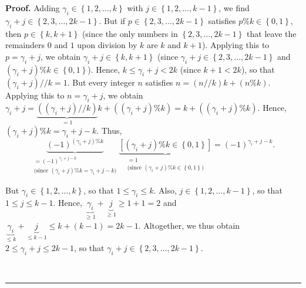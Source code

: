 \documentclass[numbers=enddot,12pt,final,onecolumn,notitlepage]{scrartcl}%
\theoremstyle{definition}
\newenvironment{proof}[1][Proof]{\noindent\textbf{#1.} }{\ \rule{0.5em}{0.5em}}
\newenvironment{verlong}{}{}
\newenvironment{vershort}{}{}
\begin{document}
\begin{proof}
\begin{vershort}
Adding $\gamma_{i}\in\left\{  1,2,\ldots,k\right\}  $ with $j\in\left\{
1,2,\ldots,k-1\right\}  $, we find $\gamma_{i}+j\in\left\{  2,3,\ldots
,2k-1\right\}  $. But if $p\in\left\{  2,3,\ldots,2k-1\right\}  $ satisfies
$p\%k\in\left\{  0,1\right\}  $, then $p\in\left\{  k,k+1\right\}  $ (since
the only numbers in $\left\{  2,3,\ldots,2k-1\right\}  $ that leave the
remainders $0$ and $1$ upon division by $k$ are $k$ and $k+1$). Applying this
to $p=\gamma_{i}+j$, we obtain $\gamma_{i}+j\in\left\{  k,k+1\right\}  $
(since $\gamma_{i}+j\in\left\{  2,3,\ldots,2k-1\right\}  $ and $\left(
\gamma_{i}+j\right)  \%k\in\left\{  0,1\right\}  $). Hence, $k\leq\gamma
_{i}+j<2k$ (since $k+1<2k$), so that $\left(  \gamma_{i}+j\right)  //k=1$. But
every integer $n$ satisfies $n=\left(  n//k\right)  k+\left(  n\%k\right)  $.
Applying this to $n=\gamma_{i}+j$, we obtain $\gamma_{i}+j=\underbrace{\left(
\left(  \gamma_{i}+j\right)  //k\right)  }_{=1}k+\left(  \left(  \gamma
_{i}+j\right)  \%k\right)  =k+\left(  \left(  \gamma_{i}+j\right)  \%k\right)
$. Hence, $\left(  \gamma_{i}+j\right)  \%k=\gamma_{i}+j-k$. Thus,%
\[
\underbrace{\left(  -1\right)  ^{\left(  \gamma_{i}+j\right)  \%k}%
}_{\substack{=\left(  -1\right)  ^{\gamma_{i}+j-k}\\\text{(since }\left(
\gamma_{i}+j\right)  \%k=\gamma_{i}+j-k\text{)}}}\underbrace{\left[  \left(
\gamma_{i}+j\right)  \%k\in\left\{  0,1\right\}  \right]  }%
_{\substack{=1\\\text{(since }\left(  \gamma_{i}+j\right)  \%k\in\left\{
0,1\right\}  \text{)}}}=\left(  -1\right)  ^{\gamma_{i}+j-k}.
\]

\end{vershort}

\begin{verlong}
But $\gamma_{i}\in\left\{  1,2,\ldots,k\right\}  $, so that $1\leq\gamma
_{i}\leq k$. Also, $j\in\left\{  1,2,\ldots,k-1\right\}  $, so that $1\leq
j\leq k-1$. Hence, $\underbrace{\gamma_{i}}_{\geq1}+\underbrace{j}_{\geq1}%
\geq1+1=2$ and $\underbrace{\gamma_{i}}_{\leq k}+\underbrace{j}_{\leq k-1}\leq
k+\left(  k-1\right)  =2k-1$. Altogether, we thus obtain $2\leq\gamma
_{i}+j\leq2k-1$, so that $\gamma_{i}+j\in\left\{  2,3,\ldots,2k-1\right\}  $.


\end{verlong}
\end{proof}
\end{document}
